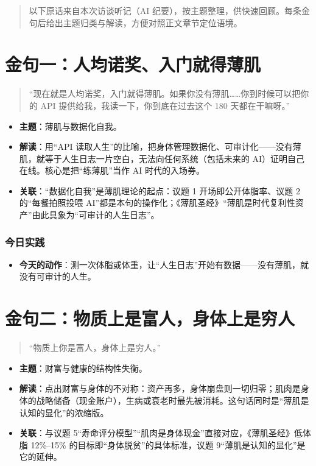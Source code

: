\begin{quote}
以下原话来自本次访谈听记（AI
纪要），按主题整理，供快速回顾。每条金句后给出主题归类与解读，方便对照正文章节定位语境。
\end{quote}

\section{金句一：人均诺奖、入门就得薄肌}

\begin{quote}
``现在就是人均诺奖，入门就得薄肌。如果你没有薄肌\ldots\ldots 你到时候可以把你的
API 提供给我，我读一下，你到底在过去这个 180 天都在干嘛呀。''
\end{quote}

\begin{itemize}
\tightlist
\item
  \textbf{主题}：薄肌与数据化自我。
\item
  \textbf{解读}：用``API
  读取人生''的比喻，把身体管理数据化、可审计化------没有薄肌，就等于人生日志一片空白，无法向任何系统（包括未来的
  AI）证明自己在线。核心是把``练薄肌''当作 AI 时代的入场券。
\item
  \textbf{关联}：``数据化自我''是薄肌理论的起点：议题 1
  开场即公开体脂率、议题 2 的``每餐拍照投喂
  AI''都是本句的操作化；《薄肌圣经》``薄肌是时代复利性资产''由此具象为``可审计的人生日志''。
\end{itemize}

\subsubsection{今日实践}

\begin{itemize}
\tightlist
\item
  \textbf{今天的动作}：测一次体脂或体重，让``人生日志''开始有数据------没有薄肌，就没有可审计的人生。
\end{itemize}

\section{金句二：物质上是富人，身体上是穷人}

\begin{quote}
``物质上你是富人，身体上是穷人。''
\end{quote}

\begin{itemize}
\tightlist
\item
  \textbf{主题}：财富与健康的结构性失衡。
\item
  \textbf{解读}：点出财富与身体的不对称：资产再多，身体崩盘则一切归零；肌肉是身体的战略储备（现金账户），生病或衰老时最先被消耗。这句话同时是``薄肌是认知的显化''的浓缩版。
\item
  \textbf{关联}：与议题
  5``寿命评分模型''``肌肉是身体现金''直接对应，《薄肌圣经》低体脂
  12\%--15\% 的目标即``身体脱贫''的具体标准，议题
  9``薄肌是认知的显化''是它的延伸。
\end{itemize}

